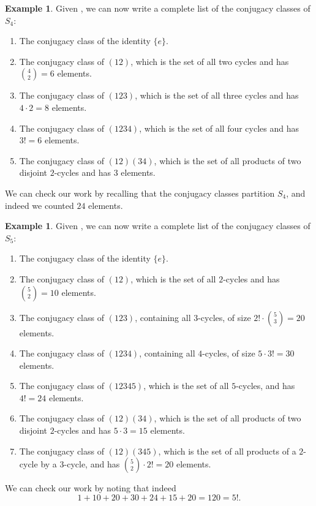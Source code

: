 \documentclass[12pt]{report}
\numberwithin{equation}{section}
\numberwithin{theorem}{chapter}
\theoremstyle{definition}
\newtheorem{example}[theorem]{Example}
\newtheorem*{basic properties}{Basic Properties}
\newtheorem*{Important Remark}{Important Remark}
\begin{document}
\begin{example}
Given , we can now write a complete list of the conjugacy classes of $S_4$:
\begin{enumerate}[itemsep=-0.1em]
\item The conjugacy class of the identity $\{e\}$. 
\item The conjugacy class of $(12)$, which is the set of all two cycles and has ${4 \choose 2} = 6$ elements.
\item The conjugacy class of $(123)$, which is the set of all three cycles and has $4 \cdot 2 = 8$ elements.
\item The conjugacy class of $(1234)$, which is the set of all four cycles and has $3! = 6$ elements.
\item The conjugacy class of $(12)(34)$, which is the set of all products of two disjoint $2$-cycles and has $3$ elements.
\end{enumerate}
We can check our work by recalling that the conjugacy classes partition $S_4$, and indeed we counted $24$ elements.
\end{example}



\begin{example}
Given , we can now write a complete list of the conjugacy classes of $S_5$:
\begin{enumerate}[itemsep=-0.1em]
\item The conjugacy class of the identity $\{e\}$. 
\item The conjugacy class of $(12)$, which is the set of all $2$-cycles and has ${5 \choose 2} = 10$ elements.
\item The conjugacy class of $(123)$, containing all $3$-cycles, of size $2! \cdot {5 \choose 3} = 20$ elements.
\item The conjugacy class of $(1234)$, containing all $4$-cycles, of size $5 \cdot 3! = 30$ elements.
\item The conjugacy class of $(12345)$, which is the set of all $5$-cycles, and has $4! = 24$ elements.
\item The conjugacy class of $(12)(34)$, which is the set of all products of two disjoint $2$-cycles and has $5 \cdot  3= 15$ elements.
\item The conjugacy class of $(12)(345)$, which is the set of all products of a $2$-cycle by a $3$-cycle, and has ${5 \choose 2} \cdot 2! = 20$ elements.
\end{enumerate}
We can check our work by noting that indeed
$$1 + 10 + 20 + 30 + 24 + 15 + 20 = 120 = 5!.$$
\end{example}
\end{document}
